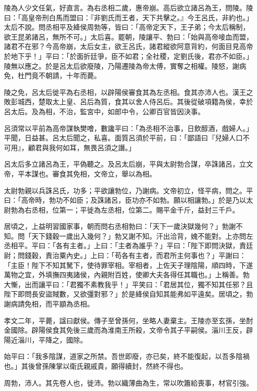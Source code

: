 \begin{pinyinscope}
陵為人少文任氣，好直言。為右丞相二歲，惠帝崩。高后欲立諸呂為王，問陵。陵曰：「高皇帝刑白馬而盟曰：『非劉氏而王者，天下共擊之。』今王呂氏，非約也。」太后不說。問丞相平及絳侯周勃等，皆曰：「高帝定天下，王子弟；今太后稱制，欲王昆弟諸呂，無所不可。」太后喜。罷朝，陵讓平、勃曰：「始與高帝唼血而盟，諸君不在邪？今高帝崩，太后女主，欲王呂氏，諸君縱欲阿意背約，何面目見高帝於地下乎！」平曰：「於面折廷爭，臣不如君；全社稷，定劉氏後，君亦不如臣。」陵無以應之。於是呂太后欲廢陵，乃陽遷陵為帝太傅，實奪之相權。陵怒，謝病免，杜門竟不朝請，十年而薨。

陵之免，呂太后徙平為右丞相，以辟陽侯審食其為左丞相。食其亦沛人也。漢王之敗彭城西，楚取太上皇、呂后為質，食其以舍人侍呂后。其後從破項籍為侯，幸於呂太后。及為相，不治，監宮中，如郎中令，公卿百官皆因決事。

呂須常以平前為高帝謀執樊噲，數讒平曰：「為丞相不治事，日飲醇酒，戲婦人。」平聞，日益甚。呂太后聞之，私喜。面質呂須於平前，曰：「鄙語曰『兒婦人口不可用』，顧君與我何如耳，無畏呂須之譖。」

呂太后多立諸呂為王，平偽聽之。及呂太后崩，平與太尉勃合謀，卒誅諸呂，立文帝，平本謀也。審食其免相，文帝立，舉以為相。

太尉勃親以兵誅呂氏，功多；平欲讓勃位，乃謝病。文帝初立，怪平病，問之。平曰：「高帝時，勃功不如臣；及誅諸呂，臣功亦不如勃。願以相讓勃。」於是乃以太尉勃為右丞相，位第一；平徙為左丞相，位第二。賜平金千斤，益封三千戶。

居頃之，上益明習國家事，朝而問右丞相勃曰：「天下一歲決獄幾何？」勃謝不知。問「天下錢穀一歲出入幾何？」勃又謝不知。汗出洽背，媿不能對。上亦問左丞相平。平曰：「各有主者。」上曰：「主者為誰乎？」平曰：「陛下即問決獄，責廷尉；問錢穀，責治粟內史。」上曰：「苟各有主者，而君所主何事也？」平謝曰：「主臣！陛下不知其駑下，使待罪宰相。宰相者，上佐天子理陰陽，順四時，下遂萬物之宜，外填撫四夷諸侯，內親附百姓，使卿大夫各得任其職也。」上稱善。勃大慚，出而讓平曰：「君獨不素教我乎！」平笑曰：「君居其位，獨不知其任邪？且陛下即問長安盜賊數，又欲彊對邪？」於是絳侯自知其能弗如平遠矣。居頃之，勃謝病請免相，而平顓為丞相。

孝文二年，平薨，諡曰獻侯。傳子至曾孫何，坐略人妻棄主。王陵亦至玄孫，坐酎金國除。辟陽侯食其免後三歲而為淮南王所殺，文帝令其子平嗣侯。淄川王反，辟陽近淄川，平降之，國除。

始平曰：「我多陰謀，道家之所禁。吾世即廢，亦已矣，終不能復起，以吾多陰禍也。」其後曾孫陳掌以衛氏親戚貴，願得續封，然終不得也。

周勃，沛人。其先卷人也，徙沛。勃以織薄曲為生，常以吹簫給喪事，材官引強。


\end{pinyinscope}
